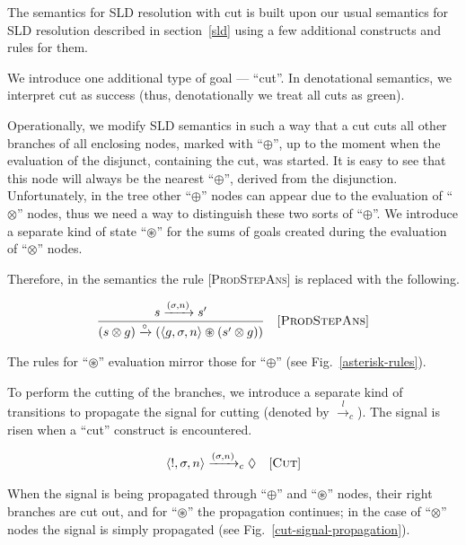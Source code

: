 The semantics for SLD resolution with cut is built upon our usual semantics for SLD resolution described in section~\ref{sld} using a few additional constructs and rules for them.

We introduce one additional type of goal --- ``cut''. In denotational semantics, we interpret cut as success (thus, denotationally we treat all cuts as green).

Operationally, we modify SLD semantics in such a way that a cut cuts all other branches of all enclosing nodes, marked with ``$\oplus$'', up to
the moment when the evaluation of the disjunct, containing the cut, was started. It is easy to see that this node will always
be the nearest ``$\oplus$'', derived from the disjunction. Unfortunately, in the tree other ``$\oplus$'' nodes can
appear due to the evaluation of ``$\otimes$'' nodes, thus we need a way to distinguish these two sorts of ``$\oplus$''. We introduce a separate kind of state ``$\circledast$'' for the sums of goals created during the evaluation of ``$\otimes$'' nodes.

Therefore, in the semantics the rule \textsc{[ProdStepAns]} is replaced with the following.

\[
\begin{array}{cr}
  \dfrac{s \xrightarrow{(\sigma, n)} s'}{(s \otimes g) \xrightarrow{\circ} (\left<{g, \sigma, n}\right> \circledast (s' \otimes g))} & \mbox{[\textsc{ProdStepAns}]} 
\end{array}
\]
\vskip3mm

The rules for ``$\circledast$'' evaluation mirror those for ``$\oplus$'' (see Fig.~\ref{asterisk-rules}).

To perform the cutting of the branches, we introduce a separate kind of transitions to propagate the signal for cutting (denoted by $\xrightarrow{l}_c$). The signal is risen when a ``cut'' construct is encountered.

\[
\begin{array}{cr}
  \left<{!, \sigma, n}\right> \xrightarrow{(\sigma, n)}_c \Diamond &\mbox{[\textsc{Cut}]} 
\end{array}
\]
\vskip3mm

When the signal is being propagated through ``$\oplus$'' and ``$\circledast$'' nodes, their right branches are cut out, and for ``$\circledast$'' the
propagation continues; in the case of ``$\otimes$'' nodes the signal is simply propagated (see Fig.~\ref{cut-signal-propagation}).